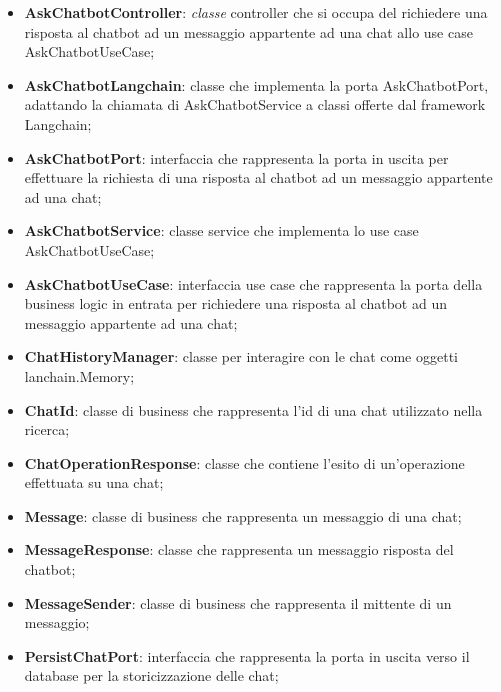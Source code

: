 \documentclass[10pt, a4paper]{article}
\begin{document}
    


\begin{itemize}
    \item \label{AskChatbotController}\textbf{AskChatbotController}: \textit{classe\pg} controller che si occupa del richiedere una risposta al chatbot ad un messaggio appartente ad una chat allo use case AskChatbotUseCase;
    \item \label{AskChatbotLangchain}\textbf{AskChatbotLangchain}: classe che implementa la porta AskChatbotPort, adattando la chiamata di AskChatbotService a classi offerte dal framework Langchain;
    \item \label{AskChatbotPort}\textbf{AskChatbotPort}: interfaccia che rappresenta la porta in uscita per effettuare la richiesta di una risposta al chatbot ad un messaggio appartente ad una chat;%
    \item \label{AskChatbotService}\textbf{AskChatbotService}: classe service che implementa lo use case AskChatbotUseCase;
    \item \label{AskChatbotUseCase}\textbf{AskChatbotUseCase}: interfaccia use case che rappresenta la porta della business logic in entrata per richiedere una risposta al chatbot ad un messaggio appartente ad una chat;
    \item \label{ChatHistoryManager}\textbf{ChatHistoryManager}: classe per interagire con le chat come oggetti lanchain.Memory;
    \item \label{ChatId}\textbf{ChatId}: classe di business che rappresenta l'id di una chat utilizzato nella ricerca;
    \item \label{ChatOperationResponse}\textbf{ChatOperationResponse}: classe che contiene l'esito di un'operazione effettuata su una chat;
    \item \label{Message}\textbf{Message}: classe di business che rappresenta un messaggio di una chat;
    \item \label{MessageResponse}\textbf{MessageResponse}: classe che rappresenta un messaggio risposta del chatbot;
    \item \label{MessageSender}\textbf{MessageSender}: classe di business che rappresenta il mittente di un messaggio;
    \item \label{PersistChatPort}\textbf{PersistChatPort}: interfaccia che rappresenta la porta in uscita verso il database per la storicizzazione delle chat;

\end{itemize}
\end{document}
